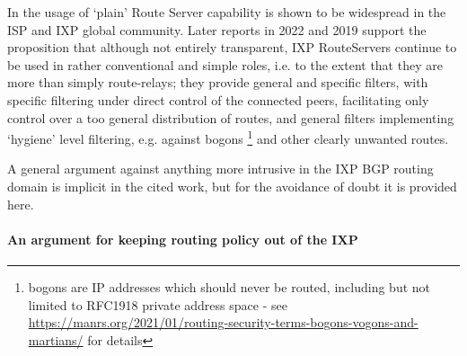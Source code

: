 In \cite{Richter2014} the  usage of `plain' Route Server capability is shown to be widespread in the ISP and IXP global community.  Later reports in 2022 \cite{Mazzola2022} and 2019 \cite{Madory2019} support the proposition that although not entirely transparent, IXP RouteServers continue to be used in rather conventional and simple roles, i.e. to the extent that they are more than simply route-relays; they provide general and specific filters, with specific filtering under direct control of the connected peers, facilitating only control over a too general distribution of routes, and general filters implementing `hygiene' level filtering, e.g. against bogons
\footnote{bogons are IP addresses which should never be routed, including but not limited to RFC1918 private address space - see \url{https://manrs.org/2021/01/routing-security-terms-bogons-vogons-and-martians/} for details}
and other clearly unwanted routes.



A general argument against anything more intrusive in the IXP BGP  routing domain is implicit in the cited work, but for the avoidance of doubt it is provided here.


\paragraph{An argument for keeping routing policy out of the IXP}
\smallskip


